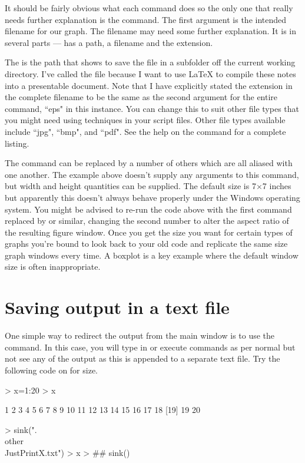  
It should be fairly obvious what each command does so the only one that really needs further explanation is the  command. The first argument is the intended filename for our graph. The filename may need some further explanation. It is in several parts ---  has a path, a filename and the extension. 
 
The  is the path that shows \R{} to save the file in a subfolder off the current working directory. I've called the file  because I want to use \LaTeX{} to compile these notes into a presentable document. 
Note that I have explicitly stated the extension in the complete filename to be the same as the second argument for the entire command, ``eps" in this instance. You can change this to suit other file types that you might need using  techniques in your script files. Other file types available include ``jpg", ``bmp", and ``pdf". See the help on the  command for a complete listing. 
 
The  command can be replaced by a number of others which are all aliased with one another. The example above doesn't supply any arguments to this command, but width and height quantities can be supplied. The default size is 7$\times$7 inches but apparently this doesn't always behave properly under the Windows operating system. You might be advised to re-run the code above with the first command replaced by  or similar, changing the second number to alter the aspect ratio of the resulting figure window. Once you get the size you want for certain types of graphs you're bound to look back to your old code and replicate the same size graph windows every time. A boxplot is a key example where the default window size is often inappropriate. 
 
\section{Saving output in a text file}\label{TextSink} 
 
One simple way to redirect the output from the main \R{} window is to use the  command. In this case, you will type in or execute commands as per normal but not see any of the output as this is appended to a separate text file. Try the following code on for size. 
 
\begin{Schunk}
\begin{Sinput}
> x=1:20 
> x 
\end{Sinput}
\begin{Soutput}
 [1]  1  2  3  4  5  6  7  8  9 10 11 12 13 14 15 16 17 18
[19] 19 20
\end{Soutput}
\end{Schunk}
\begin{Schunk}
\begin{Sinput}
> sink(".\\other\\JustPrintX.txt")
> x
> ## sink()
\end{Sinput}
\end{Schunk}
 
